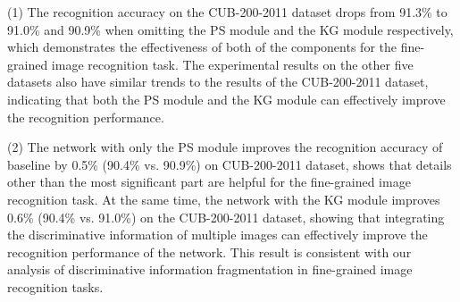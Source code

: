 \documentclass[5p,twocolumn]{elsarticle}
\begin{document}
\begin{table*}[h]
\centering
\caption{Ablation results of the proposed TPSKG on the fine-grained image datasets.}
\label{tab:ablation}
\end{table*}

(1) The recognition accuracy on the CUB-200-2011 dataset drops from 91.3\% to 91.0\% and 90.9\% when omitting the PS module and the KG module respectively, which demonstrates the effectiveness of both of the components for the fine-grained image recognition task. The experimental results on the other five datasets also have similar trends to the results of the CUB-200-2011 dataset, indicating that both the PS module and the KG module can effectively improve the recognition performance. 

(2) The network with only the PS module improves the recognition accuracy of baseline by 0.5\% (90.4\% vs. 90.9\%) on CUB-200-2011 dataset, shows that details other than the most significant part are helpful for the fine-grained image recognition task. At the same time, the network with the KG module improves 0.6\% (90.4\% vs. 91.0\%) on the CUB-200-2011 dataset, showing that integrating the discriminative information of multiple images can effectively improve the recognition performance of the network. This result is consistent with our analysis of discriminative information fragmentation in fine-grained image recognition tasks.
\end{document}

